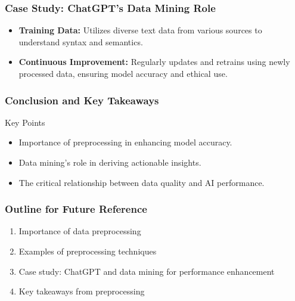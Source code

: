 \documentclass[aspectratio=169]{beamer}
\begin{document}
\begin{frame}[fragile]
    \frametitle{Case Study: ChatGPT's Data Mining Role}
    \begin{itemize}
        \item \textbf{Training Data:} 
            Utilizes diverse text data from various sources to understand syntax and semantics.
        \item \textbf{Continuous Improvement:} 
            Regularly updates and retrains using newly processed data, ensuring model accuracy and ethical use.
    \end{itemize}
\end{frame}

\begin{frame}[fragile]
    \frametitle{Conclusion and Key Takeaways}
    \begin{block}{Key Points}
        \begin{itemize}
            \item Importance of preprocessing in enhancing model accuracy.
            \item Data mining's role in deriving actionable insights.
            \item The critical relationship between data quality and AI performance.
        \end{itemize}
    \end{block}
\end{frame}

\begin{frame}[fragile]
    \frametitle{Outline for Future Reference}
    \begin{enumerate}
        \item Importance of data preprocessing
        \item Examples of preprocessing techniques
        \item Case study: ChatGPT and data mining for performance enhancement
        \item Key takeaways from preprocessing
    \end{enumerate}
\end{frame}
\end{document}
